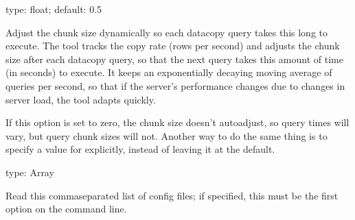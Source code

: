 \documentclass[letterpaper,10pt,english]{sphinxmanual}
\begin{document}
\begin{fulllineitems}
\label{\detokenize{mariadb-schema-change:cmdoption-mariadb-schema-change-chunk-time}}
type: float; default: 0.5

Adjust the chunk size dynamically so each data\sphinxhyphen{}copy query takes this long to
execute.  The tool tracks the copy rate (rows per second) and adjusts the chunk
size after each data\sphinxhyphen{}copy query, so that the next query takes this amount of
time (in seconds) to execute.  It keeps an exponentially decaying moving average
of queries per second, so that if the server’s performance changes due to
changes in server load, the tool adapts quickly.

If this option is set to zero, the chunk size doesn’t auto\sphinxhyphen{}adjust, so query
times will vary, but query chunk sizes will not. Another way to do the same
thing is to specify a value for {\hyperref[\detokenize{mariadb-schema-change:cmdoption-mariadb-schema-change-chunk-size}]{}} explicitly, instead of leaving
it at the default.

\end{fulllineitems}


\begin{fulllineitems}
\label{\detokenize{mariadb-schema-change:cmdoption-mariadb-schema-change-config}}
type: Array

Read this comma\sphinxhyphen{}separated list of config files; if specified, this must be the
first option on the command line.

\end{fulllineitems}

\end{document}
